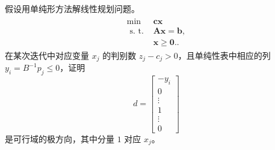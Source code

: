 \begin{problem}
    假设用单纯形方法解线性规划问题。
    \begin{align*}
        \begin{array}{ll}
            \min & \boldsymbol{c x} \\
            \text { s. t. } & \boldsymbol{A x}=\boldsymbol{b}, \\
            & \boldsymbol{x} \geqslant \mathbf{0 .} .
        \end{array}
    \end{align*}
    在某次迭代中对应变量 $x_j$ 的判别数 $z_j - c_j > 0$，且单纯性表中相应的列 $y_i = B^{-1}p_j \le 0$，证明 \[d = \begin{bmatrix}
        -y_i\\
        0\\
        \vdots\\
        1\\
        \vdots\\
        0
    \end{bmatrix}\]
    是可行域的极方向，其中分量 $1$ 对应 $x_j$。
\end{problem}
